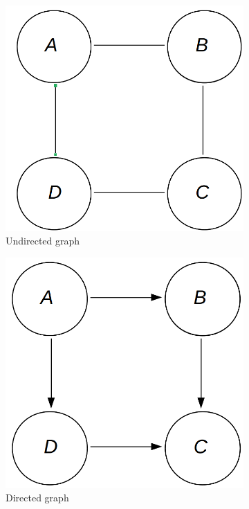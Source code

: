 \documentclass[12pt,oneside,openany,a4paper, %
afrikaans,english,
]{memoir}
\numberwithin{equation}{chapter}
\begin{document}
\begin{figure}[h!]
  \centering
  \begin{subfigure}[b]{0.3\linewidth}
    \includegraphics[width=\linewidth]{Figures/undirected_graph.png}
    \caption{Undirected graph}
  \end{subfigure}
  \begin{subfigure}[b]{0.3\linewidth}
    \includegraphics[width=\linewidth]{Figures/directed_graph.png}
    \caption{Directed graph}
  \end{subfigure}
  \caption{}
  \label{fig:comGraphs}
\end{figure}
\end{document}
